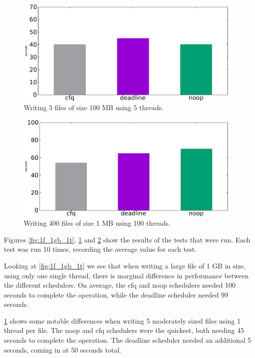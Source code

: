\documentclass[10pt, titlepage, oneside, a4paper]{article}
\begin{document}
        \begin{figure}
            \centering
            \includegraphics[width=1.0\textwidth]{5f_100mb_5t.pdf}
            \caption{Writing 5 files of size 100 MB using 5 threads.}
            \label{fig:5f_100mb_5t}
        \end{figure}
        
        \begin{figure}
            \centering
            \includegraphics[width=1.0\textwidth]{400f_1mb_100t.pdf}
            \caption{Writing 400 files of size 1 MB using 100 threads.}
            \label{fig:400f_1mb_100t}
        \end{figure}
        

        Figures \ref{fig:1f_1gb_1t}, \ref{fig:5f_100mb_5t} and \ref{fig:400f_1mb_100t} show the results of the tests that were run. Each test was run 10 times, recording the average value for each test.
        
        Looking at \ref{fig:1f_1gb_1t} we see that when writing a large file of 1 GB in size, using only one single thread, there is marginal difference in performance between the different schedulers. On average, the cfq and noop schedulers needed 100 seconds to complete the operation, while the deadline scheduler needed 99 seconds.
        
        \ref{fig:5f_100mb_5t} shows some notable differences when writing 5 moderately sized files using 1 thread per file. The noop and cfq schedulers were the quickest, both needing 45 seconds to complete the operation. The deadline scheduler needed an additional 5 seconds, coming in at 50 seconds total.
        
\end{document}
